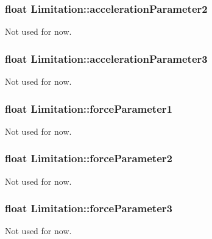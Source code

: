 \subsubsection[{\texorpdfstring{acceleration\+Parameter2}{accelerationParameter2}}]{\setlength{\rightskip}{0pt plus 5cm}float Limitation\+::acceleration\+Parameter2}\hypertarget{structLimitation_a1bc77d927cb14ce2f963ccfa53fb0d99}{}\label{structLimitation_a1bc77d927cb14ce2f963ccfa53fb0d99}
Not used for now. 
\subsubsection[{\texorpdfstring{acceleration\+Parameter3}{accelerationParameter3}}]{\setlength{\rightskip}{0pt plus 5cm}float Limitation\+::acceleration\+Parameter3}\hypertarget{structLimitation_a23cd4303674bd42a0e583fced50a3511}{}\label{structLimitation_a23cd4303674bd42a0e583fced50a3511}
Not used for now. 
\subsubsection[{\texorpdfstring{force\+Parameter1}{forceParameter1}}]{\setlength{\rightskip}{0pt plus 5cm}float Limitation\+::force\+Parameter1}\hypertarget{structLimitation_abafcff837c521cea6d410245547b148e}{}\label{structLimitation_abafcff837c521cea6d410245547b148e}
Not used for now. 
\subsubsection[{\texorpdfstring{force\+Parameter2}{forceParameter2}}]{\setlength{\rightskip}{0pt plus 5cm}float Limitation\+::force\+Parameter2}\hypertarget{structLimitation_a4a48f99b82a0078cfedb029c92355bef}{}\label{structLimitation_a4a48f99b82a0078cfedb029c92355bef}
Not used for now. 
\subsubsection[{\texorpdfstring{force\+Parameter3}{forceParameter3}}]{\setlength{\rightskip}{0pt plus 5cm}float Limitation\+::force\+Parameter3}\hypertarget{structLimitation_a25a3f8ac4759c63b46d2201b651817e5}{}\label{structLimitation_a25a3f8ac4759c63b46d2201b651817e5}
Not used for now. 
